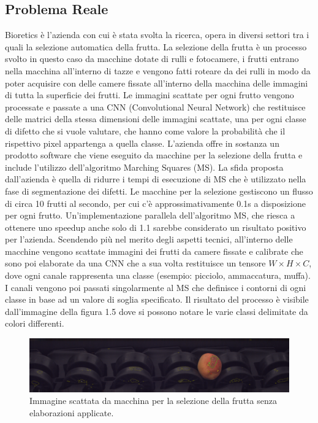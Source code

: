 \documentclass[12pt,a4paper]{report}
\begin{document}
\subsection{Problema Reale}
Bioretics è l'azienda con cui è stata svolta la ricerca, opera in diversi settori tra i quali la selezione automatica della frutta. La selezione della frutta è un processo svolto in questo caso da macchine dotate di rulli e fotocamere, i frutti entrano nella macchina all'interno di tazze e vengono fatti roteare da dei rulli in modo da poter acquisire con delle camere fissate all'interno della macchina delle immagini di tutta la superficie dei frutti. Le immagini scattate per ogni frutto vengono processate e passate a una CNN (Convolutional Neural Network) che restituisce delle matrici della stessa dimensioni delle immagini scattate, una per ogni classe di difetto che si vuole valutare, che hanno come valore la probabilità che il rispettivo pixel appartenga a quella classe. \newline
L'azienda offre in sostanza un prodotto software che viene eseguito da macchine per la selezione della frutta e include l’utilizzo dell'algoritmo Marching Squares (MS). La sfida proposta dall'azienda è quella di ridurre i tempi di esecuzione di MS che è utilizzato nella fase di segmentazione dei difetti.
Le macchine per la selezione gestiscono un flusso di circa 10 frutti al secondo, per cui c'è approssimativamente 0.1s a disposizione per ogni frutto. Un’implementazione parallela dell’algoritmo MS, che riesca a ottenere uno speedup anche solo di 1.1 sarebbe considerato un risultato positivo per l’azienda.
Scendendo più nel merito degli aspetti tecnici, all’interno delle macchine vengono scattate immagini dei frutti da camere fissate e calibrate che sono poi elaborate da una CNN che a sua volta restituisce un tensore $W\times H\times C$, dove ogni canale rappresenta una classe (esempio: picciolo, ammaccatura, muffa).
I canali vengono poi passati singolarmente al MS che definisce i contorni di ogni classe in base ad un valore di soglia specificato. Il risultato del processo è visibile dall’immagine della figura 1.5 dove si possono notare le varie classi delimitate da colori differenti. \newline
\begin{figure}[H]
    \centering
    \includegraphics[scale=0.25]{img/marching_squares_00000052_00000001.png}
    \caption{Immagine scattata da macchina per la selezione della frutta senza elaborazioni applicate.}
\end{figure} 
\end{document}
